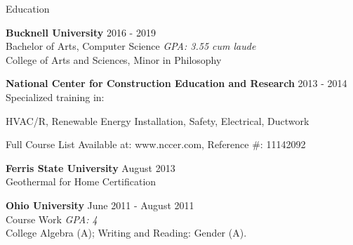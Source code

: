 \documentclass{resume} %
\begin{document}
\begin{rSection}{Education}

{\bf Bucknell University} {2016 - 2019} 
\\ Bachelor of Arts, Computer Science  {\em GPA: 3.55 cum laude}
\\ College of Arts and Sciences, Minor in Philosophy 
\iffalse

{\bf Harrisburg Area Community College} {June 2014 - May 2017} 
\\ Associate of Arts, Mathematics and Computer Science {\em GPA: 3.96}
\begin{rSubSection}{}{
   \itemsep -0.5em \vspace{-0.5em} %
   
    \item {HACC Student Government Association:} Legislative Chair; Senator; Ethics Committee Chair
    \item {Phi Beta Lambda:} President
    \item {Phi Theta Kappa:} Member}
    
  \end{rSubSection}
Modern Culture and the Arts (A); Intro to Statistics (A); English Composition (A); Trigonometry (A); Principles of Accounting I (A); Pre-Calculus (A); General Psychology (A); Principles of Accounting II (A); Effective Speaking (A);  Applied Calculus for Business (A); Principles of Marketing (A); General Biology I (A); Java Programming (A); Calculus I (A); Introduction to Sociology (A); Intro to Computer Systems (A); Computer Science I (A); Object Oriented Programming (B); Calculus II (A); Beginning Self-Defence (A); General Inorganic Chemistry I (A); Computer Science II (A); Discrete Mathematics (A); Linear Algebra (A).
\fi

{\bf National Center for Construction Education and Research} {2013 - 2014} 
\\ Specialized training in: 
\begin{rSubSection}{}{
    \item HVAC/R, Renewable Energy Installation, Safety, Electrical, Ductwork  {}
    \item Full Course List Available at: www.nccer.com, Reference \#: 11142092}
\end{rSubSection}


{\bf Ferris State University} {August 2013} 
\\ Geothermal for Home Certification {}

\iffalse
{\bf Ohio University} {June 2011 - August 2011} 
\\ Course Work {\em GPA: 4}
\smallskip \\
College Algebra (A); Writing and Reading: Gender (A).


\end{rSection}
\end{document}
